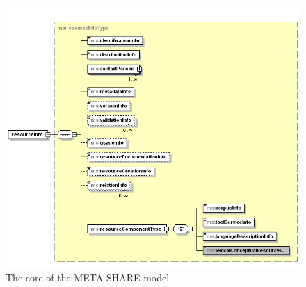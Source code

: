 \documentclass{llncs}
\begin{document}
\begin{figure}
    \centering
    \includegraphics[width=.8\textwidth]{figure_resource.png}
    \caption{\label{fig:resource}The core of the META-SHARE model}
\end{figure}
\end{document}
